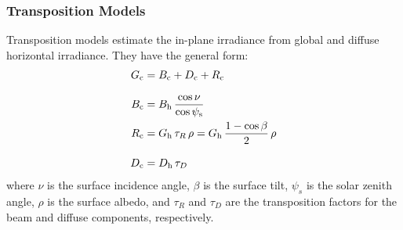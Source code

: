 \begin{frame}
    \frametitle{Transposition Models}
    Transposition models estimate the in-plane irradiance from global and diffuse
    horizontal irradiance. They have the general form:
    \begin{align}
        G_{\text{c}} &= B_{\text{c}} + D_{\text{c}} + R_{\text{c}} \nonumber
        \\[8pt]
        B_{\text{c}} &= B_{\text{h}} \, \frac{\cos \nu}{\cos \psi_{\text{s}}} \nonumber
        \\[0pt]
        R_{\text{c}} &= G_{\text{h}} \, \tau_{R} \, \rho = G_{\text{h}} \, \frac{1 - \cos \beta}{2} \, \rho \nonumber
         \\[8pt]
        D_{\text{\text{c}}} &= D_{\text{h}} \, \tau_{D} \nonumber
    \end{align}
    where \(\nu\) is the surface incidence angle, \(\beta\) is the surface tilt, \(\psi_{s}\) is the solar
    zenith angle, \(\rho\) is the surface albedo, and \(\tau_{R}\) and \(\tau_{D}\) are the
    transposition factors for the beam and diffuse components, respectively.
\end{frame}